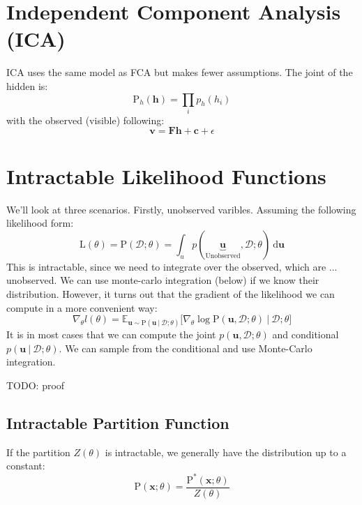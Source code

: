 \documentclass{article}
\newcommand{\prob}{\text{P}}
\renewcommand{\vec}[1]{\mathbf{#1}}
\newcommand{\bx}{\vec{x}}
\newcommand{\bu}{\vec{u}}
\newcommand{\giv}{\ |\ }
\begin{document}
\section{Independent Component Analysis (ICA)}
ICA uses the same model as FCA but makes fewer assumptions. The joint of the hidden is:
% 
\begin{equation*}
    \prob_h(\mathbf{h}) = \prod_i p_h(h_i)
\end{equation*}
% 
with the observed (visible) following:
% 
\begin{equation*}
    \mathbf{v} = \mathbf{F} \mathbf{h} + \mathbf{c} + \epsilon 
\end{equation*}

\section{Intractable Likelihood Functions}
We'll look at three scenarios. Firstly, unobserved varibles. Assuming the following likelihood form:
% 
\begin{equation*}
    \text{L}(\theta) = \prob(\mathcal{D}; \theta) =
        \int_u p(\underbrace{\mathbf{u}}_\text{Unobserved}, \mathcal{D}; \theta)\ \text{d}\mathbf{u}
\end{equation*}
%
This is intractable, since we need to integrate over the observed, which are ... unobserved. We can use monte-carlo integration (below) if we know their distribution. However, it turns out that the gradient of the likelihood we can compute in a more convenient way:
% 
\begin{equation*}
    \nabla_\theta l(\theta) = \mathbb{E}_{\bu \sim \prob(\bu \giv \mathcal{D}; \theta)} \bigg[ \nabla_\theta \log \prob(\bu, \mathcal{D}; \theta) \giv \mathcal{D}; \theta \bigg]
\end{equation*}
% 
It is in most cases that we can compute the joint $p(\bu, \mathcal{D}; \theta)$ and conditional $p(\bu \giv \mathcal{D}; \theta)$. We can sample from the conditional and use Monte-Carlo integration.

TODO: proof

\subsection{Intractable Partition Function}
If the partition $Z(\theta)$ is intractable, we generally have the distribution up to a constant:
% 
\begin{equation*}
    \prob(\bx; \theta) = \frac{
        \prob^*(\bx; \theta)
    } {
        Z(\theta)
    }
\end{equation*}
\end{document}
